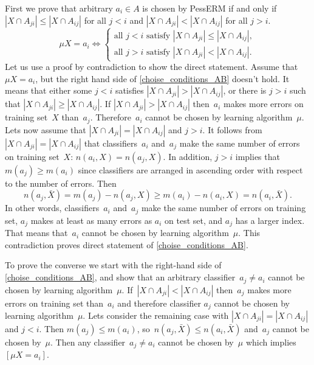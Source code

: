 \documentclass{article}
\renewcommand{\geq}{\geqslant}
\renewcommand{\leq}{\leqslant}
\begin{document}
First we prove that arbitrary $a_i \in A$ is chosen by PessERM if and only if $|X \cap A_{ji}| \leq |X \cap A_{ij}|$ for all $j < i$ and
$|X \cap A_{ji}| < |X \cap A_{ij}|$ for all $j > i$.
\begin{equation}
\label{choise_conditions_AB}
    \mu X = a_i \Leftrightarrow
	\begin{cases}
         \text {all } j < i \text{ satisfy } |X \cap A_{ji}| \leq |X \cap A_{ij}|, \\
		 \text {all } j > i \text{ satisfy } |X \cap A_{ji}| < |X \cap A_{ij}|.
	\end{cases}
\end{equation}
Let us use a proof by contradiction to show the direct statement.
Assume that $\mu X = a_i$, but the right hand side of \eqref{choise_conditions_AB} doesn't hold.
It means that either some $j < i$ satisfies $|X \cap A_{ji}| > |X \cap A_{ij}|$,
or there is $j > i$ such that $|X \cap A_{ji}| \geq |X \cap A_{ij}|$.
If $|X \cap A_{ji}| > |X \cap A_{ij}|$ then~$a_i$ makes more errors on training set~$X$ than~$a_j$.
Therefore~$a_i$ cannot be chosen by learning algorithm~$\mu$.
Lets now assume that
$|X \cap A_{ji}| = |X \cap A_{ij}|$
and
$j > i$.
It follows from~$|X \cap A_{ji}| = |X \cap A_{ij}|$
that classifiers~$a_i$ and~$a_j$ make the same number of errors
on training set~$X$:
$n(a_i, X) = n(a_j, X)$.
In addition, $j > i$ implies that~$m(a_j) \geq m(a_i)$
since classifiers are arranged in ascending order
with respect to the number of errors.
Then
\[
    n(a_j, \bar X)
    =
    m(a_j) - n(a_j, X)
    \geq
    m(a_i) - n(a_i, X)
    =
    n(a_i, \bar X).
\]
In other words, classifiers~$a_i$ and~$a_j$
make the same number of errors on training set,
$a_j$ makes at least as many errors as $a_i$ on test set, and $a_j$ has a larger index.
That means that~$a_i$ cannot be chosen by learning algorithm~$\mu$.
This contradiction proves direct statement of \eqref{choise_conditions_AB}.

To prove the converse we start with the right-hand side of \eqref{choise_conditions_AB}, and show that
an arbitrary classifier~$a_j \neq a_i$ cannot be chosen by learning algorithm~$\mu$.
If~$|X \cap A_{ji}| < |X \cap A_{ij}|$
then~$a_j$ makes more errors on training set than~$a_i$ and therefore classifier $a_j$ cannot be chosen
by learning algorithm~$\mu$.
Lets consider the remaining case with $|X \cap A_{ji}| = |X \cap A_{ij}|$ and $j < i$.
Then $m(a_j) \leq m(a_i)$,
so~$n(a_j, \bar X) \leq n(a_i, \bar X)$ and~$a_j$ cannot be chosen by~$\mu$.
Then any classifier~$a_j \neq a_i$ cannot be chosen by~$\mu$ which implies~$[\mu X = a_i]$.
\end{document}

